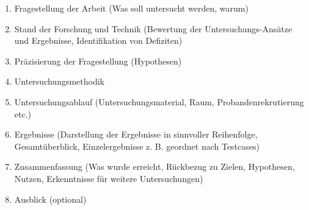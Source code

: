 \begin{enumerate}
    \item{Fragestellung der Arbeit (Was soll untersucht werden, warum)}
    \item{Stand der Forschung und Technik (Bewertung der Untersuchungs-Ansätze und Ergebnisse, Identifikation von Defiziten)}
    \item{Präzisierung der Fragestellung (Hypothesen)}
    \item{Untersuchungsmethodik }
    \item{Untersuchungsablauf (Untersuchungsmaterial, Raum, Probandenrekrutierung etc.)}
    \item{Ergebnisse (Darstellung der Ergebnisse in sinnvoller  Reihenfolge, Gesamtüberblick, Einzelergebnisse z. B. geordnet nach Testcases)}
    \item{Zusammenfassung (Was wurde erreicht, Rückbezug zu Zielen, Hypothesen, Nutzen, Erkenntnisse für weitere Untersuchungen)}
    \item{Ausblick (optional)}
\end{enumerate}
